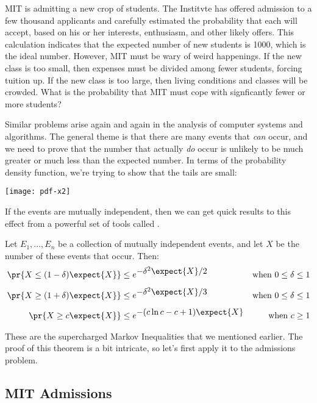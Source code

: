 \begin{editingnotes}
MIT is admitting a new crop of students.  The Institvte has offered
admission to a few thousand applicants and carefully estimated the
probability that each will accept, based on his or her interests,
enthusiasm, and other likely offers.  This calculation indicates that
the expected number of new students is 1000, which is the ideal
number.  However, MIT must be wary of weird happenings.  If the new
class is too small, then expenses must be divided among fewer
students, forcing tuition up.  If the new class is too large, then
living conditions and classes will be crowded.  What is the
probability that MIT must cope with signficantly fewer or more
students?

Similar problems arise again and again in the analysis of computer
systems and algorithms.  The general theme is that there are many
events that \textit{can} occur, and we need to prove that the number
that actually \textit{do} occur is unlikely to be much greater or much
less than the expected number.  In terms of the probability density
function, we're trying to show that the tails are small:
%
\begin{center}
\texttt{[image: pdf-x2]}
\end{center}
%
If the events are mutually independent, then we can get quick results
to this effect from a powerful set of tools called .

\begin{theorem}
\label{th:chernoff}
Let $E_1, \ldots, E_n$ be a collection of mutually independent events,
and let $X$ be the number of these events that occur.  Then:
%
\begin{align*}
\pr{X \leq (1 - \delta) \expect{X}} & \leq e^{\textstyle -\delta^2 \expect{X} / 2}
    & \text{when $0 \leq \delta \leq 1$} \\[1ex]
\pr{X \geq (1 + \delta) \expect{X}} & \leq e^{\textstyle -\delta^2 \expect{X} / 3}
    & \text{when $0 \leq \delta \leq 1$} \\[1ex]
\pr{X \geq c \expect{X}} & \leq e^{\textstyle -(c \ln c - c + 1) \expect{X}}
    & \text{when $c \geq 1$}
\end{align*}
\end{theorem}

\noindent These are the supercharged Markov Inequalities that we
mentioned earlier.  The proof of this theorem is a bit intricate, so
let's first apply it to the admissions problem.

\subsection{MIT Admissions}


\end{editingnotes}
